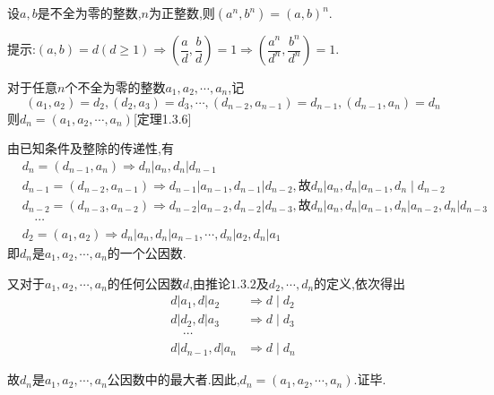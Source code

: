 \corollary 设$a,b$是不全为零的整数,$n$为正整数,则$(a^{n},b^{n})=(a,b)^{n}$.

提示:$(a,b)=d(d\geqslant 1)\Rightarrow\left( \dfrac{a}{d},\dfrac{b}{d}\right) =1\Rightarrow\left( \dfrac{a^{n}}{d^{n}},\dfrac{b^{n}}{d^{n}}\right) =1$.

\theorem 对于任意$n$个不全为零的整数$a_{1}, a_{2}, \cdots, a_{n}$,记
\begin{equation*}
	\left(a_{1}, a_{2}\right)=d_{2},\left(d_{2}, a_{3}\right)=d_{3}, \cdots,\left(d_{n-2}, a_{n-1}\right)=d_{n-1},\left(d_{n-1}, a_{n}\right)=d_{n}
\end{equation*}
则$d_{n}=\left(a_{1}, a_{2}, \cdots, a_{n}\right)${\color{red}[定理1.3.6]}

\proof 由已知条件及整除的传递性,有
\begin{equation*}
	\begin{aligned}
		&d_{n}=\left(d_{n-1}, a_{n}\right) \Rightarrow d_{n}\left|a_{n}, d_{n}\right| d_{n-1} \\
		&d_{n-1}=\left(d_{n-2}, a_{n-1}\right) \Rightarrow d_{n-1}\left|a_{n-1}, d_{n-1}\right| d_{n-2},\text{故} d_{n}\left|a_{n}, d_{n}\right| a_{n-1}, d_{n} \mid d_{n-2} \\
		&d_{n-2}=\left(d_{n-3}, a_{n-2}\right) \Rightarrow d_{n-2}\left|a_{n-2}, d_{n-2}\right| d_{n-3},\text{故} d_{n}\left|a_{n}, d_{n}\right| a_{n-1}, d_{n}\left|a_{n-2}, d_{n}\right| d_{n-3} \\
		&\quad \cdots \\
		&d_{2}=\left(a_{1}, a_{2}\right) \Rightarrow d_{n}\left|a_{n}, d_{n}\right| a_{n-1}, \cdots, d_{n}\left|a_{2}, d_{n}\right| a_{1}
	\end{aligned}
\end{equation*}
即$d_{n}$是$a_{1}, a_{2}, \cdots, a_{n}$的一个公因数.

又对于$a_{1}, a_{2}, \cdots, a_{n}$的任何公因数$d$,由推论$1.3.2$及$d_{2}, \cdots, d_{n}$的定义,依次得出
\begin{equation*}
	\begin{split}
		d\left|a_{1}, d\right| a_{2} &\Rightarrow d \mid d_{2} \\
		d\left|d_{2}, d\right| a_{3} &\Rightarrow d \mid d_{3} \\
		\quad \cdots \\
		d\left|d_{n-1}, d\right| a_{n} &\Rightarrow d \mid d_{n}
	\end{split}
\end{equation*}

故$d_{n}$是$a_{1}, a_{2}, \cdots, a_{n}$公因数中的最大者.因此,$d_{n}=\left(a_{1}, a_{2}, \cdots, a_{n}\right)$.证毕.

